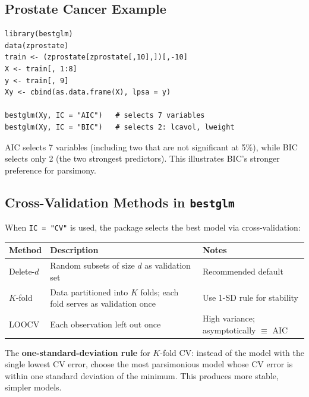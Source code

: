 \documentclass[11pt]{article}
\begin{document}
\subsection{Prostate Cancer Example}
\begin{verbatim}
library(bestglm)
data(zprostate)
train <- (zprostate[zprostate[,10],])[,-10]
X <- train[, 1:8]
y <- train[, 9]
Xy <- cbind(as.data.frame(X), lpsa = y)

bestglm(Xy, IC = "AIC")   # selects 7 variables
bestglm(Xy, IC = "BIC")   # selects 2: lcavol, lweight
\end{verbatim}

AIC selects 7 variables (including two that are not significant at
5\%), while BIC selects only 2 (the two strongest predictors).
This illustrates BIC's stronger preference for parsimony.

\subsection{Cross-Validation Methods in \texttt{bestglm}}
When \texttt{IC = "CV"} is used, the package selects the best model
via cross-validation:

\begin{center}
\begin{tabular}{@{}lll@{}}
\toprule
\textbf{Method} & \textbf{Description} & \textbf{Notes} \\
\midrule
Delete-$d$ & Random subsets of size $d$ as validation set & Recommended default \\
$K$-fold   & Data partitioned into $K$ folds; each fold serves as validation once & Use 1-SD rule for stability \\
LOOCV      & Each observation left out once & High variance; asymptotically $\equiv$ AIC \\
\bottomrule
\end{tabular}
\end{center}

The \textbf{one-standard-deviation rule} for $K$-fold CV: instead of
the model with the single lowest CV error, choose the most parsimonious
model whose CV error is within one standard deviation of the minimum.
This produces more stable, simpler models.
\end{document}
